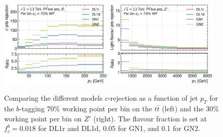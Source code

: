 \begin{figure}[h!]
  \centering
  \includegraphics[width=0.48\textwidth]{Images/FTAG/GN/GN2/pt_plots/pt_ttbar_flat_c_rej.png}
  \includegraphics[width=0.48\textwidth]{Images/FTAG/GN/GN2/pt_plots/pt_zp_flat_c_rej.png}
  \caption{Comparing the different models $c$-rejection as a function of jet $p_T$ for the $b$-tagging 70\% working point per bin on the $t\bar{t}$ (left) and the 30\% working point per bin on $Z'$ (right). The flavour fraction is set at $f^b_c = 0.018$ for DL1r and DL1d, 0.05 for GN1, and 0.1 for GN2.}
  \label{fig:GNxptb_crejflat}
\end{figure} 

